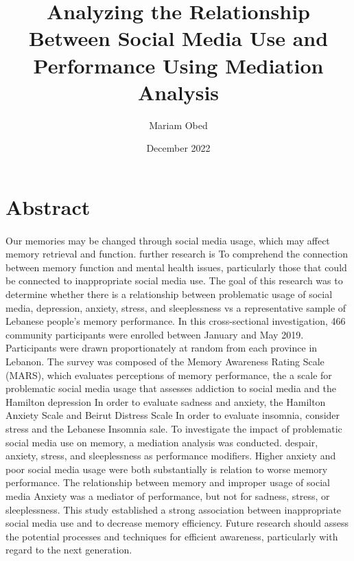 \documentclass[12pt]{report}
\title{Analyzing the Relationship Between Social Media Use and Performance Using Mediation Analysis}
\author{Mariam Obed}
\date{December 2022}
\begin{document}
\doublespacing

\maketitle

\cite{baron1986moderator}
\cite{gao2021leisure}
\cite{hayes2009beyond}
\cite{goforth2015university}
\cite{mackinnon2002comparison}
\cite{dagher2021association}
\section*{Abstract}
\paragraph{}
Our memories may be changed through social media usage, which may affect memory retrieval and function. further research is
To comprehend the connection between memory function and mental health issues,
particularly those that could be connected to inappropriate social media use. The goal of this research was to
determine whether there is a relationship between problematic usage of social media, depression, anxiety, stress, and sleeplessness vs
a representative sample of Lebanese people's memory performance.
In this cross-sectional investigation, 466 community participants were enrolled between January and May 2019.
Participants were drawn proportionately at random from each province in Lebanon. The survey was composed of
the Memory Awareness Rating Scale (MARS), which evaluates perceptions of memory performance, the
a scale for problematic social media usage that assesses addiction to social media and the Hamilton depression
In order to evaluate sadness and anxiety, the Hamilton Anxiety Scale and Beirut Distress Scale
In order to evaluate insomnia, consider stress and the Lebanese Insomnia sale. To investigate the impact of problematic social media use on memory, a mediation analysis was conducted.
despair, anxiety, stress, and sleeplessness as performance modifiers. Higher anxiety and poor social media usage were both substantially
is relation to worse memory performance. The relationship between memory and improper usage of social media
Anxiety was a mediator of performance, but not for sadness, stress, or sleeplessness. This study established a strong association between inappropriate social media use and
to decrease memory efficiency. Future research should assess the potential processes and techniques for efficient
awareness, particularly with regard to the next generation. \cite{dagher2021association}
\end{document}
